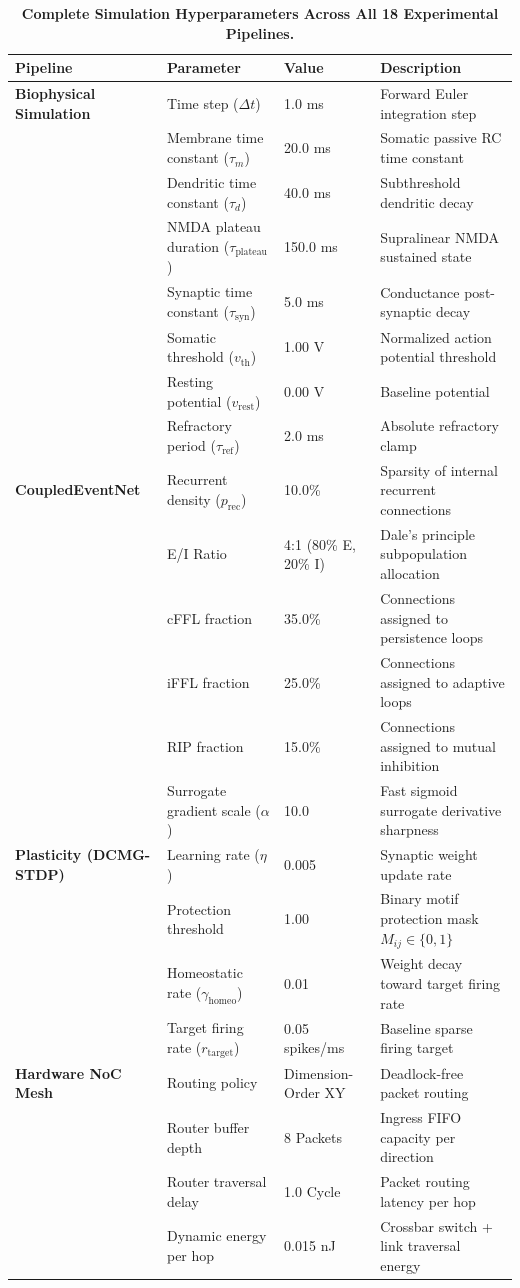 \documentclass[10pt,letterpaper]{article}
\begin{document}
\begin{table}[h]
\centering
\small
\caption{\textbf{Complete Simulation Hyperparameters Across All 18 Experimental Pipelines.}}
\begin{tabular}{llll}
\toprule
\textbf{Pipeline} & \textbf{Parameter} & \textbf{Value} & \textbf{Description} \\
\midrule
\textbf{Biophysical Simulation} & Time step ($\Delta t$) & 1.0 ms & Forward Euler integration step \\
& Membrane time constant ($\tau_m$) & 20.0 ms & Somatic passive RC time constant \\
& Dendritic time constant ($\tau_d$) & 40.0 ms & Subthreshold dendritic decay \\
& NMDA plateau duration ($\tau_{\mathrm{plateau}}$) & 150.0 ms & Supralinear NMDA sustained state \\
& Synaptic time constant ($\tau_{\mathrm{syn}}$) & 5.0 ms & Conductance post-synaptic decay \\
& Somatic threshold ($v_{\mathrm{th}}$) & 1.00 V & Normalized action potential threshold \\
& Resting potential ($v_{\mathrm{rest}}$) & 0.00 V & Baseline potential \\
& Refractory period ($\tau_{\mathrm{ref}}$) & 2.0 ms & Absolute refractory clamp \\
\midrule
\textbf{CoupledEventNet} & Recurrent density ($p_{\mathrm{rec}}$) & 10.0\% & Sparsity of internal recurrent connections \\
& E/I Ratio & 4:1 (80\% E, 20\% I) & Dale's principle subpopulation allocation \\
& cFFL fraction & 35.0\% & Connections assigned to persistence loops \\
& iFFL fraction & 25.0\% & Connections assigned to adaptive loops \\
& RIP fraction & 15.0\% & Connections assigned to mutual inhibition \\
& Surrogate gradient scale ($\alpha$) & 10.0 & Fast sigmoid surrogate derivative sharpness \\
\midrule
\textbf{Plasticity (DCMG-STDP)} & Learning rate ($\eta$) & 0.005 & Synaptic weight update rate \\
& Protection threshold & 1.00 & Binary motif protection mask $M_{ij} \in \{0, 1\}$ \\
& Homeostatic rate ($\gamma_{\mathrm{homeo}}$) & 0.01 & Weight decay toward target firing rate \\
& Target firing rate ($r_{\mathrm{target}}$) & 0.05 spikes/ms & Baseline sparse firing target \\
\midrule
\textbf{Hardware NoC Mesh} & Routing policy & Dimension-Order XY & Deadlock-free packet routing \\
& Router buffer depth & 8 Packets & Ingress FIFO capacity per direction \\
& Router traversal delay & 1.0 Cycle & Packet routing latency per hop \\
& Dynamic energy per hop & 0.015 nJ & Crossbar switch + link traversal energy \\
\bottomrule
\end{tabular}
\end{table}



\end{document}
